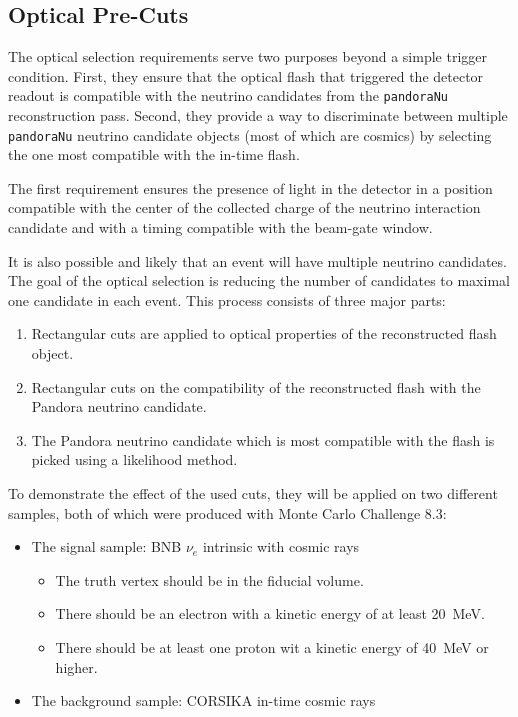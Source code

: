 \subsection{Optical Pre-Cuts}\label{sec:optical_pre_cuts}
The optical selection requirements serve two purposes beyond a simple trigger condition.  First, they ensure that the optical flash that triggered the detector readout is compatible with the neutrino candidates from the \texttt{pandoraNu} reconstruction pass.  Second, they provide a way to discriminate between multiple \texttt{pandoraNu} neutrino candidate objects (most of which are cosmics) by selecting the one most compatible with the in-time flash.

The first requirement ensures the presence of light in the detector in a position compatible with the center of the collected charge of the neutrino interaction candidate and with a timing compatible with the beam-gate window.

It is also possible and likely that an event will have multiple neutrino candidates. The goal of the optical selection is reducing the number of candidates to maximal one candidate in each event. This process consists of three major parts:
\begin{enumerate}
\item Rectangular cuts are applied to optical properties of the reconstructed flash object.
\item Rectangular cuts on the compatibility of the reconstructed flash with the Pandora neutrino candidate.
\item The Pandora neutrino candidate which is most compatible with the flash is picked using a likelihood method.
\end{enumerate}

To demonstrate the effect of the used cuts, they will be applied on two different samples, both of which were produced with Monte Carlo Challenge 8.3:
\begin{itemize}
\item The signal sample: BNB $\nu_e$ intrinsic with cosmic rays
\begin{itemize}
\item The truth vertex should be in the fiducial volume.
\item There should be an electron with a kinetic energy of at least \SI{20}{\MeV}.
\item There should be at least one proton wit a kinetic energy of \SI{40}{\MeV} or higher.
\end{itemize}
\item The background sample: CORSIKA in-time cosmic rays
\end{itemize}


